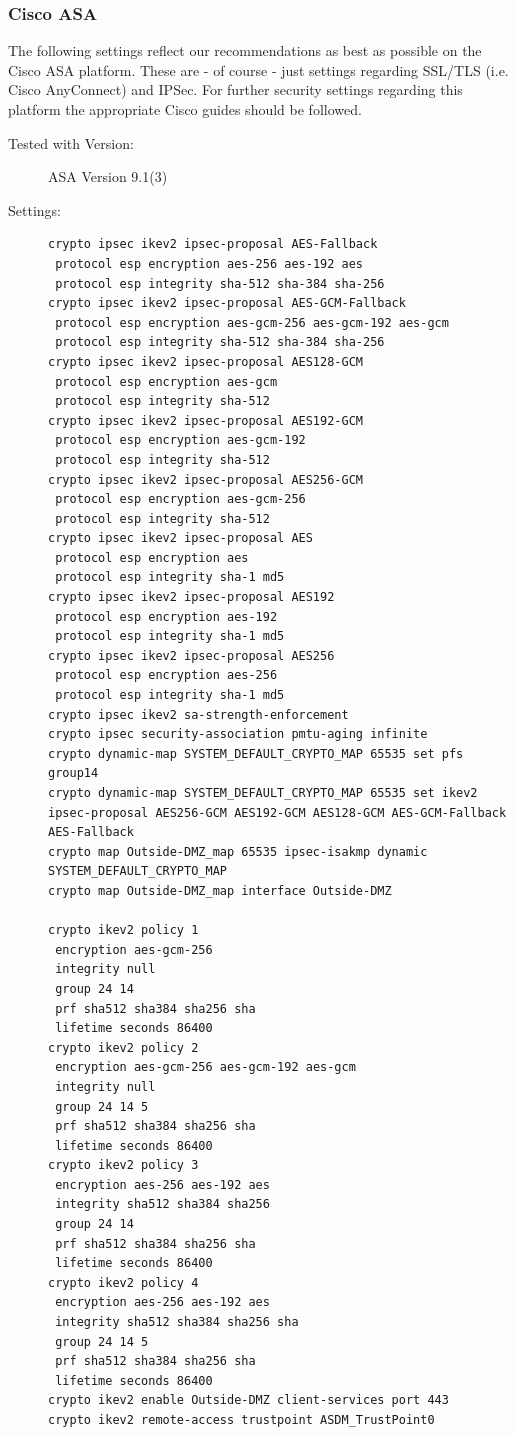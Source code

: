 \subsubsection{Cisco ASA}
The following settings reflect our recommendations as best as possible on the Cisco ASA platform. These are - of course - just settings regarding SSL/TLS (i.e. Cisco AnyConnect) and IPSec. For further security settings regarding this platform the appropriate Cisco guides should be followed.
\begin{description}
\item[Tested with Version:] 
ASA Version 9.1(3)
\item[Settings:] \mbox{}
\begin{lstlisting}[breaklines]
crypto ipsec ikev2 ipsec-proposal AES-Fallback
 protocol esp encryption aes-256 aes-192 aes
 protocol esp integrity sha-512 sha-384 sha-256
crypto ipsec ikev2 ipsec-proposal AES-GCM-Fallback
 protocol esp encryption aes-gcm-256 aes-gcm-192 aes-gcm
 protocol esp integrity sha-512 sha-384 sha-256
crypto ipsec ikev2 ipsec-proposal AES128-GCM
 protocol esp encryption aes-gcm
 protocol esp integrity sha-512
crypto ipsec ikev2 ipsec-proposal AES192-GCM
 protocol esp encryption aes-gcm-192
 protocol esp integrity sha-512
crypto ipsec ikev2 ipsec-proposal AES256-GCM
 protocol esp encryption aes-gcm-256
 protocol esp integrity sha-512
crypto ipsec ikev2 ipsec-proposal AES
 protocol esp encryption aes
 protocol esp integrity sha-1 md5
crypto ipsec ikev2 ipsec-proposal AES192
 protocol esp encryption aes-192
 protocol esp integrity sha-1 md5
crypto ipsec ikev2 ipsec-proposal AES256
 protocol esp encryption aes-256
 protocol esp integrity sha-1 md5
crypto ipsec ikev2 sa-strength-enforcement
crypto ipsec security-association pmtu-aging infinite
crypto dynamic-map SYSTEM_DEFAULT_CRYPTO_MAP 65535 set pfs group14
crypto dynamic-map SYSTEM_DEFAULT_CRYPTO_MAP 65535 set ikev2 ipsec-proposal AES256-GCM AES192-GCM AES128-GCM AES-GCM-Fallback AES-Fallback
crypto map Outside-DMZ_map 65535 ipsec-isakmp dynamic SYSTEM_DEFAULT_CRYPTO_MAP
crypto map Outside-DMZ_map interface Outside-DMZ

crypto ikev2 policy 1
 encryption aes-gcm-256
 integrity null
 group 24 14
 prf sha512 sha384 sha256 sha
 lifetime seconds 86400
crypto ikev2 policy 2
 encryption aes-gcm-256 aes-gcm-192 aes-gcm
 integrity null
 group 24 14 5
 prf sha512 sha384 sha256 sha
 lifetime seconds 86400
crypto ikev2 policy 3
 encryption aes-256 aes-192 aes
 integrity sha512 sha384 sha256
 group 24 14
 prf sha512 sha384 sha256 sha
 lifetime seconds 86400
crypto ikev2 policy 4
 encryption aes-256 aes-192 aes
 integrity sha512 sha384 sha256 sha
 group 24 14 5
 prf sha512 sha384 sha256 sha
 lifetime seconds 86400
crypto ikev2 enable Outside-DMZ client-services port 443
crypto ikev2 remote-access trustpoint ASDM_TrustPoint0


\end{lstlisting}
\end{description}
